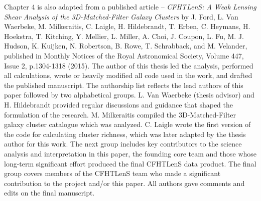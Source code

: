 Chapter 4 is also adapted from a published article -- {\it CFHTLenS: A Weak Lensing Shear Analysis of the 3D-Matched-Filter Galaxy Clusters} by J. Ford, L. Van Waerbeke, M. Milkeraitis, C. Laigle, H. Hildebrandt, T. Erben, C. Heymans, H. Hoekstra, T. Kitching, Y. Mellier, L. Miller, A. Choi, J. Coupon, L. Fu, M. J. Hudson, K. Kuijken, N. Robertson, B. Rowe, T. Schrabback, and M. Velander, published in Monthly Notices of the Royal Astronomical Society, Volume 447, Issue 2, p.1304-1318 (2015). The author of this thesis led the analysis, performed all calculations, wrote or heavily modified all code used in the work, and drafted the published manuscript. The authorship list reflects the lead authors of this paper followed by two alphabetical groups. L. Van Waerbeke (thesis advisor) and H. Hildebrandt provided regular discussions and guidance that shaped the formulation of the research. M. Milkeraitis compiled the 3D-Matched-Filter galaxy cluster catalogue which was analyzed. C. Laigle wrote the first version of the code for calculating cluster richness, which was later adapted by the thesis author for this work. The next group includes key contributors to the science analysis and interpretation in this paper, the founding core team and those whose long-term significant effort produced the final CFHTLenS data product. The final group covers members of the CFHTLenS team who made a significant contribution to the project and/or this paper. All authors gave comments and edits on the final manuscript.

